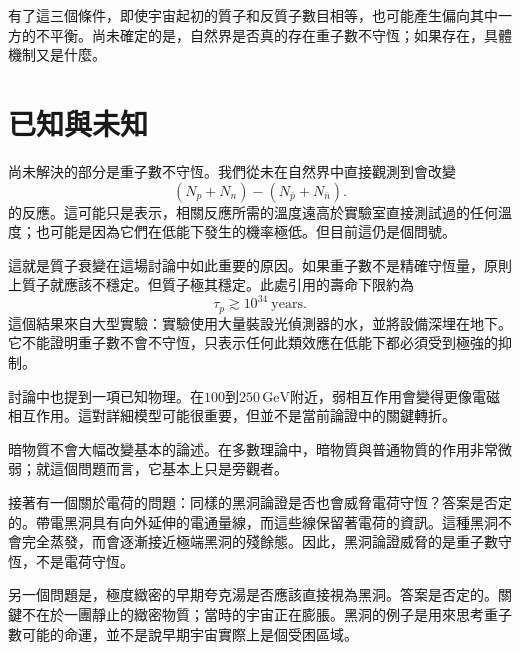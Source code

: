 \begin{classroomqa}
\end{classroomqa}

有了這三個條件，即使宇宙起初的質子和反質子數目相等，也可能產生偏向其中一方的不平衡。尚未確定的是，自然界是否真的存在重子數不守恆；如果存在，具體機制又是什麼。

\section{已知與未知}

尚未解決的部分是重子數不守恆。我們從未在自然界中直接觀測到會改變
\[
(N_p+N_n)-(N_{\bar p}+N_{\bar n}).
\]
的反應。這可能只是表示，相關反應所需的溫度遠高於實驗室直接測試過的任何溫度；也可能是因為它們在低能下發生的機率極低。但目前這仍是個問號。

這就是質子衰變在這場討論中如此重要的原因。如果重子數不是精確守恆量，原則上質子就應該不穩定。但質子極其穩定。此處引用的壽命下限約為
\[
\tau_p \gtrsim 10^{34}\ \text{years}.
\]
這個結果來自大型實驗：實驗使用大量裝設光偵測器的水，並將設備深埋在地下。它不能證明重子數不會不守恆，只表示任何此類效應在低能下都必須受到極強的抑制。

討論中也提到一項已知物理。在\(100\)到\(250\,\mathrm{GeV}\)附近，弱相互作用會變得更像電磁相互作用。這對詳細模型可能很重要，但並不是當前論證中的關鍵轉折。

暗物質不會大幅改變基本的論述。在多數理論中，暗物質與普通物質的作用非常微弱；就這個問題而言，它基本上只是旁觀者。

\begin{classroomqa}
\end{classroomqa}

接著有一個關於電荷的問題：同樣的黑洞論證是否也會威脅電荷守恆？答案是否定的。帶電黑洞具有向外延伸的電通量線，而這些線保留著電荷的資訊。這種黑洞不會完全蒸發，而會逐漸接近極端黑洞的殘餘態。因此，黑洞論證威脅的是重子數守恆，不是電荷守恆。

另一個問題是，極度緻密的早期夸克湯是否應該直接視為黑洞。答案是否定的。關鍵不在於一團靜止的緻密物質；當時的宇宙正在膨脹。黑洞的例子是用來思考重子數可能的命運，並不是說早期宇宙實際上是個受困區域。

